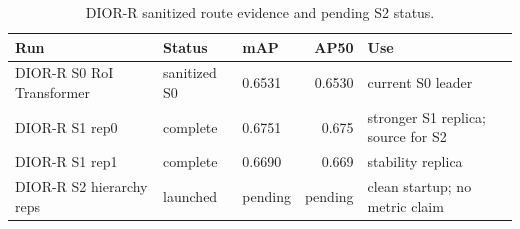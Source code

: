 \begin{table}[t]
\centering
\small
\caption{DIOR-R sanitized route evidence and pending S2 status.}
\label{tab:dior_r_current}
\begin{tabular}{lllrl}
\toprule
Run & Status & mAP & AP50 & Use \\
\midrule
DIOR-R S0 RoI Transformer & sanitized S0 & 0.6531 & 0.6530 & current S0 leader \\
DIOR-R S1 rep0 & complete & 0.6751 & 0.675 & stronger S1 replica; source for S2 \\
DIOR-R S1 rep1 & complete & 0.6690 & 0.669 & stability replica \\
DIOR-R S2 hierarchy reps & launched & pending & pending & clean startup; no metric claim \\
\bottomrule
\end{tabular}
\end{table}
